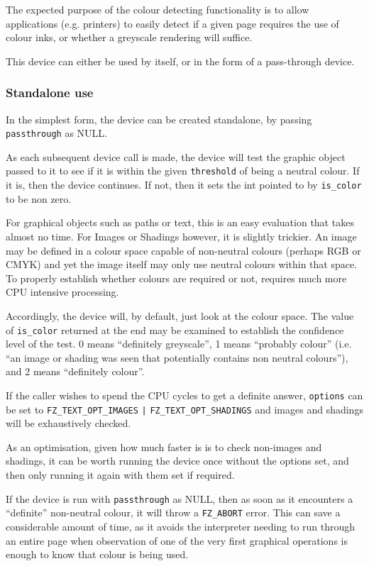 \documentclass[oneside]{book}
\begin{document}
The expected purpose of the colour detecting functionality is to allow applications (e.g. printers) to easily detect if a given page requires the use of colour inks, or whether a greyscale rendering will suffice.

This device can either be used by itself, or in the form of a pass-through device.

\subsubsection{Standalone use}

In the simplest form, the device can be created standalone, by passing \texttt{passthrough} as NULL.

As each subsequent device call is made, the device will test the graphic object passed to it to see if it is within the given \texttt{threshold} of being a neutral colour. If it is, then the device continues. If not, then it sets the int pointed to by \texttt{is\_color} to be non zero.

For graphical objects such as paths or text, this is an easy evaluation that takes almost no time. For Images or Shadings however, it is slightly trickier. An image may be defined in a colour space capable of non-neutral colours (perhaps RGB or CMYK) and yet the image itself may only use neutral colours within that space. To properly establish whether colours are required or not, requires much more CPU intensive processing.

Accordingly, the device will, by default, just look at the colour space. The value of \texttt{is\_color} returned at the end may be examined to establish the confidence level of the test. 0 means ``definitely greyscale'', 1 means ``probably colour'' (i.e. ``an image or shading was seen that potentially contains non neutral colours''), and 2 means ``definitely colour''.

If the caller wishes to spend the CPU cycles to get a definite answer, \texttt{options} can be set to \texttt{FZ\_TEXT\_OPT\_IMAGES} \texttt{|} \texttt{FZ\_TEXT\_OPT\_SHADINGS} and images and shadings will be exhaustively checked.

As an optimisation, given how much faster is is to check non-images and shadings, it can be worth running the device once without the options set, and then only running it again with them set if required.

If the device is run with \texttt{passthrough} as NULL, then as soon as it encounters a ``definite'' non-neutral colour, it will throw a \texttt{FZ\_ABORT} error. This can save a considerable amount of time, as it avoids the interpreter needing to run through an entire page when observation of one of the very first graphical operations is enough to know that colour is being used.
\end{document}
